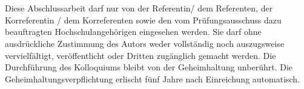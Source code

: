 \chapter*{}
\thispagestyle{empty}

Diese Abschlussarbeit darf nur von der Referentin/ dem Referenten, der Korreferentin / dem Korreferenten sowie den vom Prüfungsausschuss dazu beauftragten Hochschulangehörigen eingesehen werden. Sie darf ohne ausdrückliche Zustimmung des Autors
weder vollständig noch auszugsweise vervielfältigt, veröffentlicht oder Dritten zugänglich gemacht werden. Die Durchführung des Kolloquiums bleibt von der Geheimhaltung unberührt. Die Geheimhaltungsverpflichtung erlischt fünf Jahre nach Einreichung automatisch.
